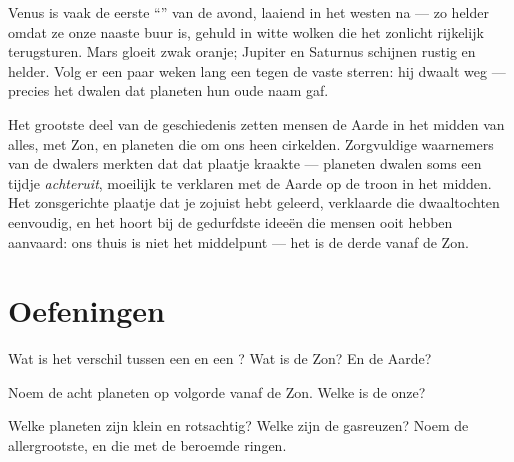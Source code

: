 \begin{example}\label{ex:g4:solar-system:wanderers}
Venus is vaak de eerste ``'' van de avond, laaiend in het westen
na  --- zo helder omdat ze onze naaste buur is,
gehuld in witte wolken die het zonlicht rijkelijk terugsturen. Mars
gloeit zwak oranje; Jupiter en Saturnus schijnen rustig en helder.
Volg er een paar weken lang een tegen de vaste sterren: hij dwaalt
weg --- precies het dwalen dat planeten hun oude naam gaf.
\end{example}

\begin{remark}\label{rem:g4:solar-system:history}
Het grootste deel van de geschiedenis zetten mensen de Aarde in het
midden van alles, met Zon,  en planeten die om ons heen
cirkelden. Zorgvuldige waarnemers van de dwalers merkten dat dat
plaatje kraakte --- planeten dwalen soms een tijdje
\emph{achteruit}, moeilijk te verklaren met de Aarde op de troon in
het midden. Het zonsgerichte plaatje dat je zojuist hebt geleerd,
verklaarde die dwaaltochten eenvoudig, en het hoort bij de
gedurfdste ideeën die mensen ooit hebben aanvaard: ons thuis is niet
het middelpunt --- het is de derde  vanaf de Zon.
\end{remark}

\section{Oefeningen}

\begin{exercise}[$\star$]\label{exo:g4:solar-system:1}
Wat is het verschil tussen een  en een ? Wat is de Zon?
En de Aarde?
\end{exercise}

\begin{exercise}[$\star$]\label{exo:g4:solar-system:2}
Noem de acht planeten op volgorde vanaf de Zon. Welke is de onze?
\end{exercise}

\begin{exercise}[$\star$]\label{exo:g4:solar-system:3}
Welke planeten zijn klein en rotsachtig? Welke zijn de gasreuzen?
Noem de allergrootste, en die met de beroemde ringen.
\end{exercise}

